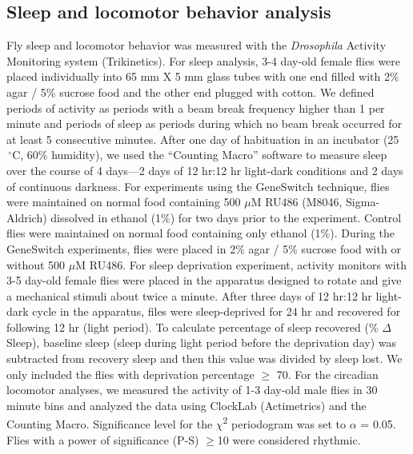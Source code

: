 \subsection*{Sleep and locomotor behavior analysis}

Fly sleep and locomotor behavior was measured with the \emph{Drosophila} Activity Monitoring system (Trikinetics).
For sleep analysis, 3-4 day-old female flies were placed individually into 65 mm X 5 mm glass tubes with one end filled with 2\% agar / 5\% sucrose food and the other end plugged with cotton.
We defined periods of activity as periods with a beam break frequency higher than 1 per minute and periods of sleep as periods during which no beam break occurred for at least 5 consecutive minutes\cite{Shaw:2000ui}.
After one day of habituation in an incubator (25$\,^{\circ}\mathrm{C}$, 60\% humidity), we used the ``Counting Macro'' software\cite{pfeiffenberger:2010ab} to measure sleep over the course of 4 days---2 days of 12 hr:12 hr light-dark conditions and 2 days of continuous darkness.
For experiments using the GeneSwitch technique, flies were maintained on normal food containing 500 $\mu$M RU486 (M8046, Sigma-Aldrich) dissolved in ethanol (1\%) for two days prior to the experiment.
Control flies were maintained on normal food containing only ethanol (1\%).
During the GeneSwitch experiments, flies were placed in 2\% agar / 5\% sucrose food with or without 500 $\mu$M RU486.
For sleep deprivation experiment, activity monitors with 3-5 day-old female flies were placed in the apparatus designed to rotate and give a mechanical stimuli about twice a minute.
After three days of 12 hr:12 hr light-dark cycle in the apparatus, files were sleep-deprived for 24 hr and recovered for following 12 hr (light period). To calculate percentage of sleep recovered (\% $\Delta$Sleep), baseline sleep (sleep during light period before the deprivation day) was subtracted from recovery sleep and then this value was divided by sleep lost.
We only included the flies with deprivation percentage $\geq$ 70.
For the circadian locomotor analyses, we measured the activity of 1-3 day-old male flies in 30 minute bins and analyzed the data using ClockLab (Actimetrics) and the Counting Macro\cite{pfeiffenberger:2010aa}. Significance level for the $\chi$\textsuperscript{2} periodogram was set to $\alpha$ = 0.05.
Flies with a power of significance (P-S) $\geq$10 were considered rhythmic.

  
